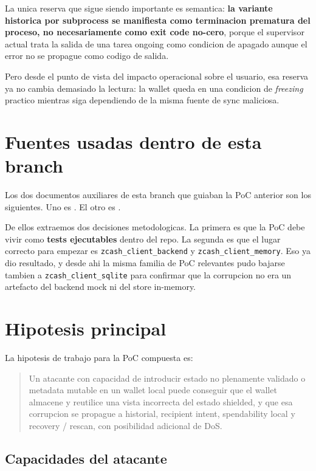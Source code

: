 \documentclass[11pt,a4paper]{article}
\begin{document}
La unica reserva que sigue siendo importante es semantica:
\textbf{la variante historica por subprocess se manifiesta como terminacion
prematura del proceso, no necesariamente como exit code no-cero}, porque el
supervisor actual trata la salida de una tarea ongoing como condicion de
apagado aunque el error no se propague como codigo de salida.

Pero desde el punto de vista del impacto operacional sobre el usuario, esa
reserva ya no cambia demasiado la lectura: la wallet queda en una condicion de
\textit{freezing} practico mientras siga dependiendo de la misma fuente de sync
maliciosa.

\section{Fuentes usadas dentro de esta branch}

Los dos documentos auxiliares de esta branch que guiaban la PoC anterior son
los siguientes. Uno es . El otro es
.

De ellos extraemos dos decisiones metodologicas. La primera es que la PoC debe
vivir como \textbf{tests ejecutables} dentro del repo. La segunda es que el
lugar correcto para empezar es \texttt{zcash\_client\_backend} y
\texttt{zcash\_client\_memory}. Eso ya dio resultado, y desde ahi la misma
familia de PoC relevantes pudo bajarse tambien a
\texttt{zcash\_client\_sqlite} para confirmar que la corrupcion no era un
artefacto del backend mock ni del store in-memory.

\section{Hipotesis principal}

La hipotesis de trabajo para la PoC compuesta es:

\begin{quote}
Un atacante con capacidad de introducir estado no plenamente validado o
metadata mutable en un wallet local puede conseguir que el wallet almacene y
reutilice una vista incorrecta del estado shielded, y que esa corrupcion se
propague a historial, recipient intent, spendability local y recovery /
rescan, con posibilidad adicional de DoS.
\end{quote}

\subsection{Capacidades del atacante}
\end{document}
